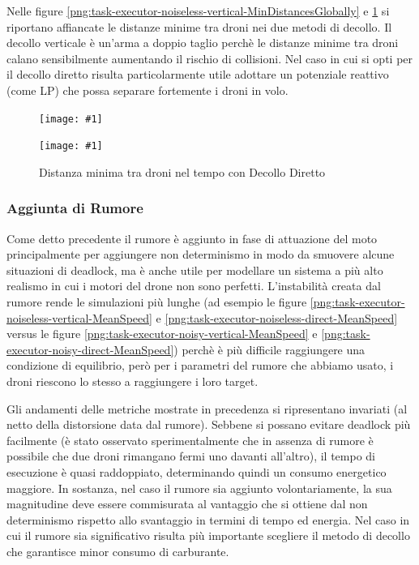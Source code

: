 \documentclass[a4paper,11pt,oneside, table]{article}
\newcommand{\putsubimage}[5] {
  \begin{minipage}{{#4}\linewidth}
	    \centering
      \texttt{[image: \#1]}
	    \caption{#2}\label{#3}
	\end{minipage}
}
\newcommand{\putimagecouple}[2] {
  \begin{figure}[!htb]
      \centering
      #1
      \hspace{0.5cm}
      #2
  \end{figure}
}
\begin{document}
Nelle figure \ref{png:task-executor-noiseless-vertical-MinDistancesGlobally} e \ref{png:task-executor-noiseless-direct-MinDistancesGlobally} si riportano affiancate le distanze minime tra droni nei due metodi di decollo.
Il decollo verticale \`e un'arma a doppio taglio perch\`e le distanze minime tra droni calano sensibilmente aumentando il rischio di collisioni.
Nel caso in cui si opti per il decollo diretto risulta particolarmente utile adottare un potenziale reattivo (come LP) che possa separare fortemente i droni in volo.

\putimagecouple
{\putsubimage{images/experiments/task-executor-noiseless-vertical/MinDistancesGlobally.png}{Distanza minima tra droni nel tempo con Decollo Verticale}{png:task-executor-noiseless-vertical-MinDistancesGlobally}{0.4}{0.99}}
{\putsubimage{images/experiments/task-executor-noiseless-direct/MinDistancesGlobally.png}{Distanza minima tra droni nel tempo con Decollo Diretto}{png:task-executor-noiseless-direct-MinDistancesGlobally}{0.4}{0.99}}

\subsubsection{Aggiunta di Rumore}

Come detto precedente il rumore \`e aggiunto in fase di attuazione del moto principalmente per aggiungere non determinismo in modo da smuovere alcune situazioni di deadlock, ma \`e anche utile per modellare un sistema a pi\`u alto realismo in cui i motori del drone non sono perfetti.
L'instabilit\`a creata dal rumore rende le simulazioni pi\`u lunghe (ad esempio le figure \ref{png:task-executor-noiseless-vertical-MeanSpeed} e \ref{png:task-executor-noiseless-direct-MeanSpeed} versus le figure \ref{png:task-executor-noisy-vertical-MeanSpeed} e \ref{png:task-executor-noisy-direct-MeanSpeed}) perch\`e \`e pi\`u difficile raggiungere una condizione di equilibrio, per\`o per i parametri del rumore che abbiamo usato, i droni riescono lo stesso a raggiungere i loro target.

Gli andamenti delle metriche mostrate in precedenza si ripresentano invariati (al netto della distorsione data dal rumore).
Sebbene si possano evitare deadlock pi\`u facilmente (\`e stato osservato sperimentalmente che in assenza di rumore \`e possibile che due droni rimangano fermi uno davanti all'altro), il tempo di esecuzione \`e quasi raddoppiato, determinando quindi un consumo energetico maggiore.
In sostanza, nel caso il rumore sia aggiunto volontariamente, la sua magnitudine deve essere commisurata al vantaggio che si ottiene dal non determinismo rispetto allo svantaggio in termini di tempo ed energia.
Nel caso in cui il rumore sia significativo risulta pi\`u importante scegliere il metodo di decollo che garantisce minor consumo di carburante.
\end{document}
